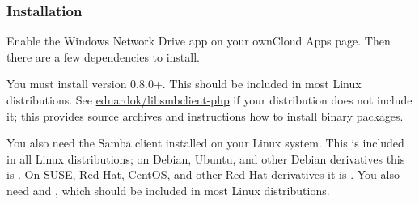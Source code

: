 \documentclass[letterpaper,10pt,english]{sphinxmanual}
\begin{document}
\subsubsection{Installation}
\label{enterprise_external_storage/windows-network-drive_configuration:installation}
Enable the Windows Network Drive app on your ownCloud Apps page. Then there are
a few dependencies to install.

You must install  version 0.8.0+. This should be included in most Linux distributions. See \href{https://github.com/eduardok/libsmbclient-php}{eduardok/libsmbclient-php} if your distribution does not include it; this provides source archives and instructions how to install binary packages.

You also need the Samba client installed on your Linux system. This is included in
all Linux distributions; on Debian, Ubuntu, and other Debian derivatives this
is . On SUSE, Red Hat, CentOS, and other Red Hat derivatives it is
. You also need  and , which should be included in most Linux distributions.
\end{document}
